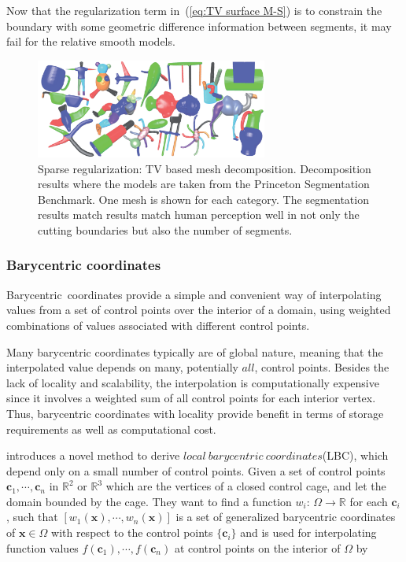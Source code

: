 Now that the regularization term in~(\ref{eq:TV surface M-S}) is to constrain the boundary with some geometric difference information between segments, it may fail for the relative smooth models.



\begin{figure}[ht]
  \centering
  \includegraphics[width=3in]{images/segmentation}
  \caption{Sparse regularization: TV based mesh decomposition\cite{zhang2012variational}. Decomposition results where the models are taken from the Princeton Segmentation Benchmark\cite{chen2009benchmark}. One mesh is shown for each category. The segmentation results match results match human perception well in not only the cutting boundaries but also the number of segments.}
  \label{fig:segmentation}
\end{figure}


\subsubsection{Barycentric coordinates}
\label{subsubsec:Barycentric coordinates}

Barycentric~coordinates provide a simple and convenient way of interpolating values from a set of control points over the interior of a domain, using weighted combinations of values associated with different control points.

Many barycentric coordinates typically are of global nature, meaning that the interpolated value depends on many, potentially $all$, control points. Besides the lack of locality and scalability, the interpolation is computationally expensive since it involves a weighted sum of all control points for each interior vertex.
Thus, barycentric coordinates with locality provide benefit in terms of storage requirements as well as computational cost.

\cite{zhang2014local} introduces a novel method to derive $local~barycentric~coordinates$(LBC), which depend only on a small number of control points.
Given a set of control points $\mathbf{c}_1, \cdots, \mathbf{c}_n$ in $\mathbb{R}^2$ or  $\mathbb{R}^3$ which are the vertices of a closed control cage, and let the domain bounded by the cage.
They want to find a function $w_{i}$: $\Omega\rightarrow\mathbb{R}$ for each $\mathbf{c}_{i}$, such that $[w_1(\mathbf{x}), \cdots, w_n(\mathbf{x})]$ is a set of generalized barycentric coordinates of $\mathbf{x}\in\Omega$ with respect to the control points $\{\mathbf{c}_{i}\}$ and is used for interpolating function values $f(\mathbf{c}_1), \cdots, f(\mathbf{c}_n)$ at control points on the interior of $\Omega$ by

